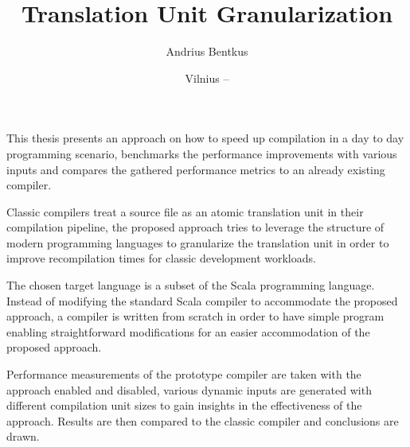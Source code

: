\documentclass{VUMIFPSbakalaurinis}
\institute{Informatikos institutas}  %
\title{Translation Unit Granularization}
\author{Andrius Bentkus}
\date{Vilnius – \the\year}
\begin{document}
\maketitle


\addtocounter{page}{1}

This thesis presents an approach on how to speed up compilation in a day to day programming scenario, benchmarks the performance improvements with various inputs and compares the gathered performance metrics to an already existing compiler.

Classic compilers treat a source file as an atomic translation unit in their compilation pipeline, the proposed approach tries to leverage the structure of modern programming languages to granularize the translation unit in order to improve recompilation times for classic development workloads.

The chosen target language is a subset of the Scala programming language.
Instead of modifying the standard Scala compiler to accommodate the proposed approach, a compiler is written from scratch in order to have simple program enabling straightforward modifications for an easier accommodation of the proposed approach.

Performance measurements of the prototype compiler are taken with the approach enabled and disabled, various dynamic inputs are generated with different compilation unit sizes to gain insights in the effectiveness of the approach.
Results are then compared to the classic compiler and conclusions are drawn.





\tableofcontents


\end{document}
